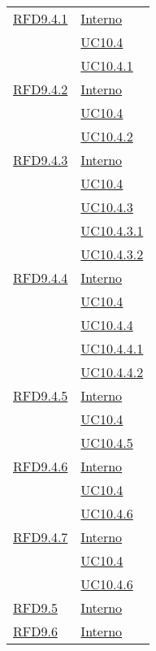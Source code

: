 \begin{longtable}{|>{\centering}m{5cm}|m{5cm}<{\centering}|}
\hyperlink{RFD9.4.1}{RFD9.4.1} & \hyperlink{Interno}{Interno}\\
& \hyperref[UC10.4]{UC10.4}\\
& \hyperref[UC10.4.1]{UC10.4.1}\\ \hline

\hyperlink{RFD9.4.2}{RFD9.4.2} & \hyperlink{Interno}{Interno}\\
& \hyperref[UC10.4]{UC10.4}\\
& \hyperref[UC10.4.2]{UC10.4.2}\\ \hline

\hyperlink{RFD9.4.3}{RFD9.4.3} & \hyperlink{Interno}{Interno}\\
& \hyperref[UC10.4]{UC10.4}\\
& \hyperref[UC10.4.3]{UC10.4.3}\\
& \hyperref[UC10.4.3.1]{UC10.4.3.1}\\
& \hyperref[UC10.4.3.2]{UC10.4.3.2}\\ \hline

\hyperlink{RFD9.4.4}{RFD9.4.4} & \hyperlink{Interno}{Interno}\\
& \hyperref[UC10.4]{UC10.4}\\
& \hyperref[UC10.4.4]{UC10.4.4}\\
& \hyperref[UC10.4.4.1]{UC10.4.4.1}\\
& \hyperref[UC10.4.4.2]{UC10.4.4.2}\\ \hline

\hyperlink{RFD9.4.5}{RFD9.4.5} & \hyperlink{Interno}{Interno}\\
& \hyperref[UC10.4]{UC10.4}\\
& \hyperref[UC10.4.5]{UC10.4.5}\\ \hline

\hyperlink{RFD9.4.6}{RFD9.4.6} & \hyperlink{Interno}{Interno}\\
& \hyperref[UC10.4]{UC10.4}\\
& \hyperref[UC10.4.6]{UC10.4.6}\\ \hline

\hyperlink{RFD9.4.7}{RFD9.4.7} & \hyperlink{Interno}{Interno}\\
& \hyperref[UC10.4]{UC10.4}\\
& \hyperref[UC10.4.6]{UC10.4.6}\\ \hline

\hyperlink{RFD9.5}{RFD9.5} & \hyperlink{Interno}{Interno}\\ \hline

\hyperlink{RFD9.6}{RFD9.6} & \hyperlink{Interno}{Interno}\\ \hline


\end{longtable}
